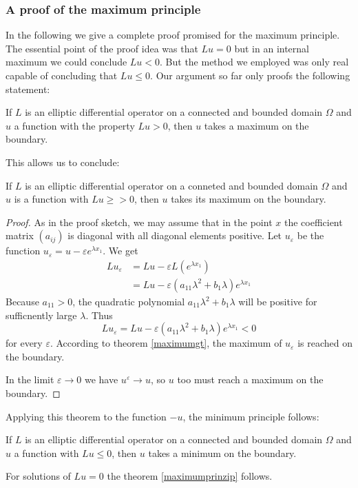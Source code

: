 {\small
\subsubsection{A proof of the maximum principle}
In the following we give a complete proof promised for the maximum principle.
The essential point of the proof idea was that $Lu=0$ but in an internal
maximum we could conclude $Lu<0$.
But the method we employed was only real capable of concluding that
$Lu\le 0$.
Our argument so far only proofs the following statement:
\begin{satz}
\label{maximumgt}
If $L$ is an elliptic differential operator on a connected and
bounded domain $\Omega$ and $u$ a function with the property $Lu>0$, then
$u$ takes a maximum on the boundary.
\end{satz}

This allows us to conclude:
\begin{satz}
If $L$ is an elliptic differential operator on a conneted and
bounded domain $\Omega$ and $u$ is a function with $Lu\ge > 0$,
then $u$ takes its maximum on the boundary.
\end{satz}

\begin{proof}
As in the proof sketch, we may assume that in the point $x$ the 
coefficient matrix $(a_{ij})$ is diagonal with all diagonal elements
positive.
Let $u_{\varepsilon}$ be the function
$u_{\varepsilon}=u-\varepsilon e^{\lambda x_1}$.
We get
\begin{align*}
Lu_{\varepsilon}&=Lu-\varepsilon L(e^{\lambda x_1})\\
&=Lu-\varepsilon(a_{11}\lambda^2+b_1\lambda)e^{\lambda x_1}
\end{align*}
Because $a_{11}>0$,
the quadratic polynomial $a_{11}\lambda^2+b_1\lambda$ will be positive
for sufficnently large $\lambda$.
Thus
\[
Lu_{\varepsilon}= Lu-\varepsilon(a_{11}\lambda^2+b_1\lambda)e^{\lambda x_1}<0
\]
for every $\varepsilon$.
According to theorem \ref{maximumgt},
the maximum of $u_\varepsilon$ is reached on the boundary.

In the limit $\varepsilon\to 0$ we have $u^\varepsilon\to u$, so
$u$ too must reach a maximum on the boundary.
\end{proof}

Applying this theorem to the function $-u$, the minimum principle follows:
\begin{satz}
If $L$ is an elliptic differential operator on a connected and
bounded domain $\Omega$ and $u$ a function with $Lu\le 0$, then
$u$ takes a minimum on the boundary.
\end{satz}

For solutions of $Lu=0$ the theorem \ref{maximumprinzip} follows.
}

